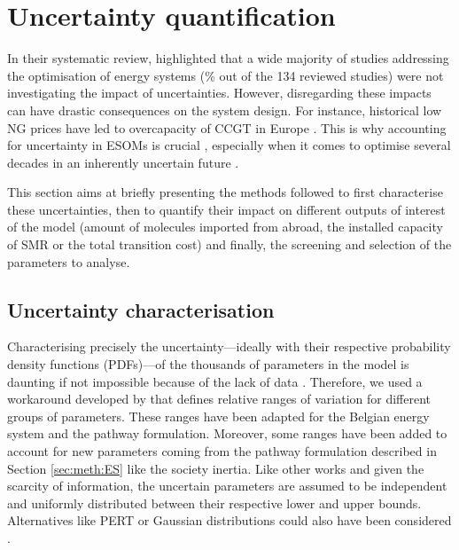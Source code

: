 \section{Uncertainty quantification}
\label{sec:meth:UQ}
In their systematic review, \citet{yue2018review} highlighted that a wide majority of studies addressing the optimisation of energy systems (\% out of the 134 reviewed studies) were not investigating the impact of uncertainties. However, disregarding these impacts can have drastic consequences on the system design. For instance, historical low \gls{NG} prices have led to overcapacity of \gls{CCGT} in Europe \cite{moret2020overcapacity}. This is why accounting for uncertainty in \gls{ESOMs} is crucial \cite{mavromatidis2018uncertainty}, especially when it comes to optimise several decades in an inherently uncertain future \cite{peace2008insights}.

This section aims at briefly presenting the methods followed to first characterise these uncertainties, then to quantify their impact on different outputs of interest of the model (\eg amount of molecules imported from abroad, the installed capacity of \gls{SMR} or the total transition cost) and finally, the screening and selection of the parameters to analyse.

\subsection{Uncertainty characterisation}
\label{subsec:uncert_charac}
Characterising precisely the uncertainty---ideally with their respective probability density functions (PDFs)---of the thousands of parameters in the model is daunting if not impossible because of the lack of data \cite{marnay2006addressing}. Therefore, we used a workaround developed by \citet{Moret2017} that defines relative ranges of variation for different groups of parameters. These ranges have been adapted for the Belgian energy system and the pathway formulation. Moreover, some ranges have been added to account for new parameters coming from the pathway formulation described in Section \ref{sec:meth:ES} like the society inertia. Like other works \cite{li2019renewables,coppitters2021robust,Moret2017PhDThesis} and given the scarcity of information, the uncertain parameters are assumed to be independent and uniformly distributed between their respective lower and upper bounds. Alternatives like PERT or Gaussian distributions could also have been considered \cite{coppittersthesis}.


